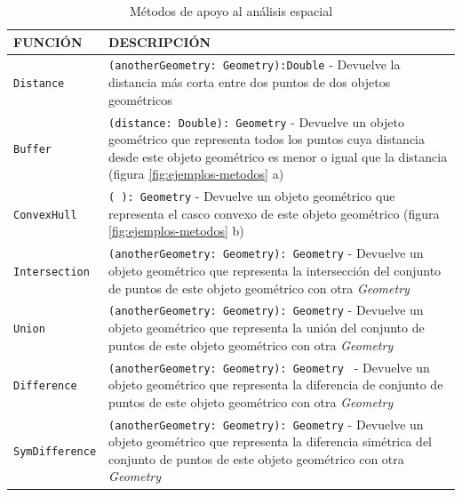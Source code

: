 \begin{table}[H]
	\caption{Métodos de apoyo al análisis espacial}
	\label{estandar-metodos}
	\centering
	\begin{tabular}{|l|m{8.6cm}|}
		\hline
		\rowcolor[HTML]{EFEFEF} 
		{\textbf{FUNCIÓN} } & {\textbf{DESCRIPCIÓN}} \\ \hline
		\texttt{Distance}		&     \texttt{(anotherGeometry: Geometry):Double} - Devuelve la distancia más corta entre dos puntos de dos objetos geométricos        \\ \hline
		\texttt{Buffer} &     \texttt{(distance: Double): Geometry} -    Devuelve un objeto geométrico que representa todos los puntos cuya distancia desde este objeto geométrico es menor o igual que la distancia (figura \ref{fig:ejemplos-metodos} a)            \\ \hline
		\texttt{ConvexHull}	& \texttt{( ): Geometry} -     Devuelve un objeto geométrico que representa el casco convexo de este objeto geométrico (figura \ref{fig:ejemplos-metodos} b)             \\ \hline
		\texttt{Intersection} &   \texttt{(anotherGeometry: Geometry): Geometry} -    Devuelve un objeto geométrico que representa la intersección del conjunto de puntos de este objeto geométrico con otra \textit{Geometry}            \\ \hline
		\texttt{Union}	&  \texttt{(anotherGeometry: Geometry): Geometry}	-    Devuelve un objeto geométrico que representa la unión del conjunto de puntos de este objeto geométrico con otra \textit{Geometry}              \\ \hline
		\texttt{Difference} &  \texttt{(anotherGeometry: Geometry): Geometry } -  Devuelve un objeto geométrico que representa la diferencia de conjunto de puntos de este objeto geométrico con otra \textit{Geometry}            \\ \hline
		\texttt{SymDifference}	&   \texttt{(anotherGeometry: Geometry): Geometry}  - Devuelve un objeto geométrico que representa la diferencia simétrica del conjunto de puntos de este objeto geométrico con otra \textit{Geometry}                 \\ \hline
	\end{tabular}
\end{table}

